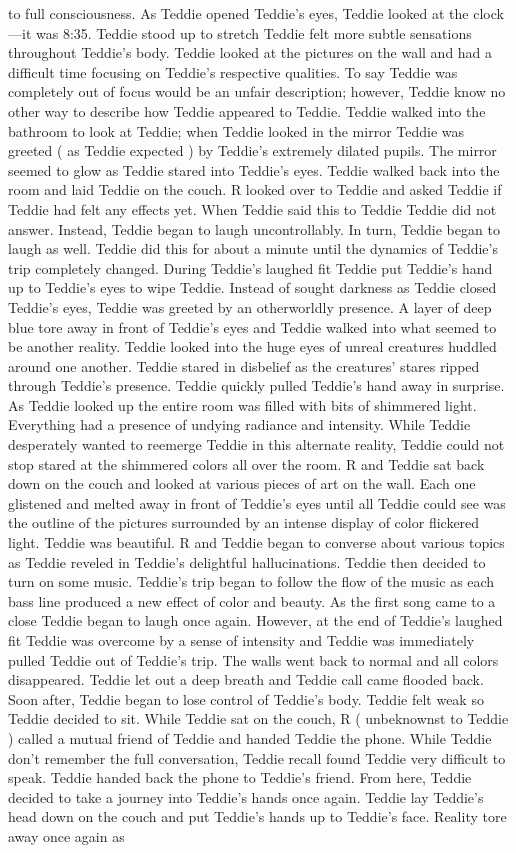 \documentclass[12pt]{book}
\begin{document}
to full consciousness. As Teddie opened Teddie's eyes, Teddie looked at the clock---it was 8:35. Teddie stood up to stretch Teddie felt more subtle sensations throughout Teddie's body. Teddie looked at the pictures on the wall and had a difficult time focusing on Teddie's respective qualities. To say Teddie was completely out of focus would be an unfair description; however, Teddie know no other way to describe how Teddie appeared to Teddie. Teddie walked into the bathroom to look at Teddie; when Teddie looked in the mirror Teddie was greeted ( as Teddie expected ) by Teddie's extremely dilated pupils. The mirror seemed to glow as Teddie stared into Teddie's eyes. Teddie walked back into the room and laid Teddie on the couch. R looked over to Teddie and asked Teddie if Teddie had felt any effects yet. When Teddie said this to Teddie Teddie did not answer. Instead, Teddie began to laugh uncontrollably. In turn, Teddie began to laugh as well. Teddie did this for about a minute until the dynamics of Teddie's trip completely changed. During Teddie's laughed fit Teddie put Teddie's hand up to Teddie's eyes to wipe Teddie. Instead of sought darkness as Teddie closed Teddie's eyes, Teddie was greeted by an otherworldly presence. A layer of deep blue tore away in front of Teddie's eyes and Teddie walked into what seemed to be another reality. Teddie looked into the huge eyes of unreal creatures huddled around one another. Teddie stared in disbelief as the creatures' stares ripped through Teddie's presence. Teddie quickly pulled Teddie's hand away in surprise. As Teddie looked up the entire room was filled with bits of shimmered light. Everything had a presence of undying radiance and intensity. While Teddie desperately wanted to reemerge Teddie in this alternate reality, Teddie could not stop stared at the shimmered colors all over the room. R and Teddie sat back down on the couch and looked at various pieces of art on the wall. Each one glistened and melted away in front of Teddie's eyes until all Teddie could see was the outline of the pictures surrounded by an intense display of color flickered light. Teddie was beautiful. R and Teddie began to converse about various topics as Teddie reveled in Teddie's delightful hallucinations. Teddie then decided to turn on some music. Teddie's trip began to follow the flow of the music as each bass line produced a new effect of color and beauty. As the first song came to a close Teddie began to laugh once again. However, at the end of Teddie's laughed fit Teddie was overcome by a sense of intensity and Teddie was immediately pulled Teddie out of Teddie's trip. The walls went back to normal and all colors disappeared. Teddie let out a deep breath and Teddie call came flooded back. Soon after, Teddie began to lose control of Teddie's body. Teddie felt weak so Teddie decided to sit. While Teddie sat on the couch, R ( unbeknownst to Teddie ) called a mutual friend of Teddie and handed Teddie the phone. While Teddie don't remember the full conversation, Teddie recall found Teddie very difficult to speak. Teddie handed back the phone to Teddie's friend. From here, Teddie decided to take a journey into Teddie's hands once again. Teddie lay Teddie's head down on the couch and put Teddie's hands up to Teddie's face. Reality tore away once again as 
\end{document}

